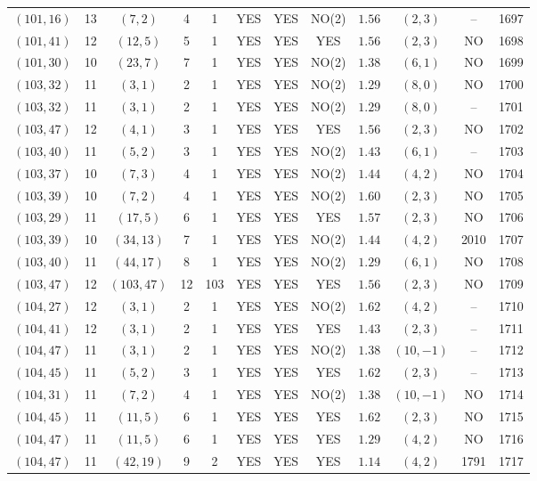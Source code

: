 \begin{longtable}{|c|c|c|c|c|c|c|c|c|c|c|c|}
$(101,16)$ & 13 & $(7,2)$ & 4 & 1 & YES & YES & NO(2) & $1.56$ & $(2,3)$ & -- & 1697\\
$(101,41)$ & 12 & $(12,5)$ & 5 & 1 & YES & YES & YES & $1.56$ & $(2,3)$ & NO & 1698\\
$(101,30)$ & 10 & $(23,7)$ & 7 & 1 & YES & YES & NO(2) & $1.38$ & $(6,1)$ & NO & 1699\\
$(103,32)$ & 11 & $(3,1)$ & 2 & 1 & YES & YES & NO(2) & $1.29$ & $(8,0)$ & NO & 1700\\
$(103,32)$ & 11 & $(3,1)$ & 2 & 1 & YES & YES & NO(2) & $1.29$ & $(8,0)$ & -- & 1701\\
$(103,47)$ & 12 & $(4,1)$ & 3 & 1 & YES & YES & YES & $1.56$ & $(2,3)$ & NO & 1702\\
$(103,40)$ & 11 & $(5,2)$ & 3 & 1 & YES & YES & NO(2) & $1.43$ & $(6,1)$ & -- & 1703\\
$(103,37)$ & 10 & $(7,3)$ & 4 & 1 & YES & YES & NO(2) & $1.44$ & $(4,2)$ & NO & 1704\\
$(103,39)$ & 10 & $(7,2)$ & 4 & 1 & YES & YES & NO(2) & $1.60$ & $(2,3)$ & NO & 1705\\
$(103,29)$ & 11 & $(17,5)$ & 6 & 1 & YES & YES & YES & $1.57$ & $(2,3)$ & NO & 1706\\
$(103,39)$ & 10 & $(34,13)$ & 7 & 1 & YES & YES & NO(2) & $1.44$ & $(4,2)$ & 2010 & 1707\\
$(103,40)$ & 11 & $(44,17)$ & 8 & 1 & YES & YES & NO(2) & $1.29$ & $(6,1)$ & NO & 1708\\
$(103,47)$ & 12 & $(103,47)$ & 12 & 103 & YES & YES & YES & $1.56$ & $(2,3)$ & NO & 1709\\
$(104,27)$ & 12 & $(3,1)$ & 2 & 1 & YES & YES & NO(2) & $1.62$ & $(4,2)$ & -- & 1710\\
$(104,41)$ & 12 & $(3,1)$ & 2 & 1 & YES & YES & YES & $1.43$ & $(2,3)$ & -- & 1711\\
$(104,47)$ & 11 & $(3,1)$ & 2 & 1 & YES & YES & NO(2) & $1.38$ & $(10,-1)$ & -- & 1712\\
$(104,45)$ & 11 & $(5,2)$ & 3 & 1 & YES & YES & YES & $1.62$ & $(2,3)$ & -- & 1713\\
$(104,31)$ & 11 & $(7,2)$ & 4 & 1 & YES & YES & NO(2) & $1.38$ & $(10,-1)$ & NO & 1714\\
$(104,45)$ & 11 & $(11,5)$ & 6 & 1 & YES & YES & YES & $1.62$ & $(2,3)$ & NO & 1715\\
$(104,47)$ & 11 & $(11,5)$ & 6 & 1 & YES & YES & YES & $1.29$ & $(4,2)$ & NO & 1716\\
$(104,47)$ & 11 & $(42,19)$ & 9 & 2 & YES & YES & YES & $1.14$ & $(4,2)$ & 1791 & 1717\\

\end{longtable}
